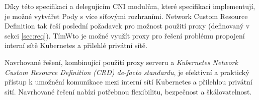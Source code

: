 Díky této specifikaci a delegujícím CNI modulům, které specifikaci implementují, je možné vytvářet Pody s více síťovými rozhraními. Network Custom Resource Definition tak řeší poslední požadavek pro možnost použití proxy (definovaný v sekci \ref{sec:req}). TímWto je možné využít proxy pro řešení problému propojení interní sítě Kubernetes a přilehlé privátní sítě.

\bigskip

Navrhované řešení, kombinující použití proxy serveru a \textit{Kubernetes Network Custom Resource Definition (CRD) de-facto standardu}, je efektivní a praktický přístup k umožnění komunikace mezi interní sítí Kubernetes a přilehlou privátní sítí. Navrhované řešení nabízí potřebnou flexibilitu, bezpečnost a škálovatelnost.

